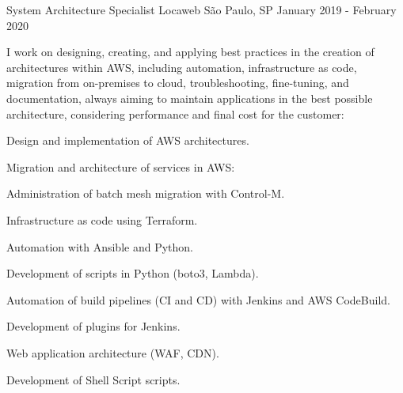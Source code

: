 \begin{cventries}
\cventry
    {System Architecture Specialist} %
    {Locaweb} %
    {São Paulo, SP} %
    {January 2019 - February 2020} %
    {
      \begin{cvitems} %
       \item {I work on designing, creating, and applying best practices in the creation of architectures within AWS, including automation, infrastructure as code, migration from on-premises to cloud, troubleshooting, fine-tuning, and documentation, always aiming to maintain applications in the best possible architecture, considering performance and final cost for the customer:}
       \item {Design and implementation of AWS architectures.}
       \item {Migration and architecture of services in AWS:}
       \item {}
       \item {}
       \item {}
       \item {}
       \item {}
       \item {}
       \item {Administration of batch mesh migration with Control-M.}
       \item {Infrastructure as code using Terraform.}
       \item {Automation with Ansible and Python.}
       \item {Development of scripts in Python (boto3, Lambda).}
       \item {Automation of build pipelines (CI and CD) with Jenkins and AWS CodeBuild.}
       \item {Development of plugins for Jenkins.}
       \item {}
       \item {}
       \item {Web application architecture (WAF, CDN).}
       \item {Development of Shell Script scripts.}
      \end{cvitems}
    }



\end{cventries}
